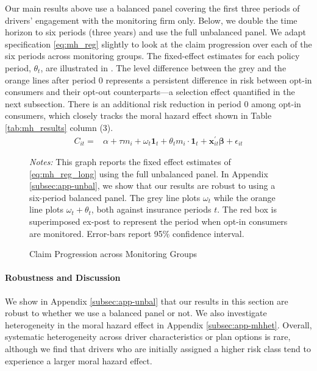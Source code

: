 Our main results above use a balanced panel covering the first three periods of drivers' engagement with the monitoring firm only. Below, we double the time horizon to six periods (three years) and use the full unbalanced panel. We adapt specification \ref{eq:mh_reg} slightly to look at the claim progression over each of the six periods across monitoring groups. The fixed-effect estimates for each policy period, $\theta_t$, are illustrated in . The level difference between the grey and the orange lines after period 0 represents a persistent difference in risk between opt-in consumers and their opt-out counterparts---a selection effect quantified in the next subsection. There is an additional risk reduction in period 0 among opt-in consumers, which closely tracks the moral hazard effect shown in Table \ref{tab:mh_results} column (3).
\begin{align}
C_{it}= & \alpha+\tau m_{i}+\omega_t\mathbf{1}_{t}+\theta_{t}m_{i}\cdot\mathbf{1}_{t}+\mathbf{x}_{it}^{\prime}\mathbf{\beta}+\epsilon_{it}\label{eq:mh_reg_long}
\end{align}
\vspace{-0.5cm}
\begin{figure}[htbp!]
\centering
{}
\caption{Claim Progression across Monitoring Groups \label{fig:rf-illus}}
\vspace{0.1cm}
\begin{minipage}{0.95\textwidth} %
    {\footnotesize \emph{Notes: }This graph reports the fixed effect estimates of \cref{eq:mh_reg_long} using the full unbalanced panel. In Appendix \ref{subsec:app-unbal}, we show that our results are robust to using a six-period balanced panel. The grey line plots $\omega_t$ while the orange line plots $\omega_t + \theta_t$, both against insurance periods $t$. The red box is superimposed ex-post to represent the period when opt-in consumers are monitored. Error-bars report 95\% confidence interval. \par}
\end{minipage}
\par
\end{figure}
\vspace{-1em}

\paragraph{Robustness and Discussion}
We show in Appendix \ref{subsec:app-unbal} that our results in this section are robust to whether we use a balanced panel or not. We also investigate heterogeneity in the moral hazard effect in Appendix \ref{subsec:app-mhhet}. Overall, systematic heterogeneity across driver characteristics or plan options is rare, although we find that drivers who are initially assigned a higher risk class tend to experience a larger moral hazard effect.

